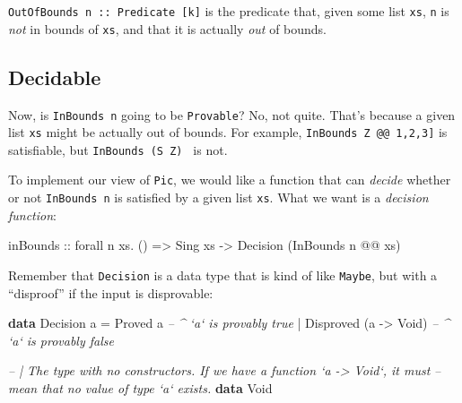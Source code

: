 \documentclass[]{article}
\newenvironment{Shaded}{}{}
\newcommand{\CommentTok}[1]{\textcolor[rgb]{0.38,0.63,0.69}{\textit{#1}}}
\newcommand{\DataTypeTok}[1]{\textcolor[rgb]{0.56,0.13,0.00}{#1}}
\newcommand{\FunctionTok}[1]{\textcolor[rgb]{0.02,0.16,0.49}{#1}}
\newcommand{\KeywordTok}[1]{\textcolor[rgb]{0.00,0.44,0.13}{\textbf{#1}}}
\newcommand{\NormalTok}[1]{#1}
\newcommand{\OtherTok}[1]{\textcolor[rgb]{0.00,0.44,0.13}{#1}}
\begin{document}
\texttt{OutOfBounds\ n\ ::\ Predicate\ {[}k{]}} is the predicate that, given
some list \texttt{xs}, \texttt{n} is \emph{not} in bounds of \texttt{xs}, and
that it is actually \emph{out} of bounds.

\hypertarget{decidable}{%
\subsection{Decidable}\label{decidable}}

Now, is \texttt{InBounds\ n} going to be \texttt{Provable}? No, not quite.
That's because a given list \texttt{xs} might be actually out of bounds. For
example,
\texttt{InBounds\ \textquotesingle{}Z\ @@\ \textquotesingle{}{[}1,2,3{]}} is
satisfiable, but
\texttt{InBounds\ (\textquotesingle{}S\ \textquotesingle{}Z)\ \textquotesingle{}{[}{]}}
is not.

To implement our view of \texttt{Pic}, we would like a function that can
\emph{decide} whether or not \texttt{InBounds\ n} is satisfied by a given list
\texttt{xs}. What we want is a \emph{decision function}:

\begin{Shaded}
\begin{Highlighting}[]
\OtherTok{inBounds ::}\NormalTok{ forall n xs}\FunctionTok{.}\NormalTok{ ()}
         \OtherTok{=>} \DataTypeTok{Sing}\NormalTok{ xs}
         \OtherTok{->} \DataTypeTok{Decision}\NormalTok{ (}\DataTypeTok{InBounds}\NormalTok{ n }\FunctionTok{@@}\NormalTok{ xs)}
\end{Highlighting}
\end{Shaded}

Remember that \texttt{Decision} is a data type that is kind of like
\texttt{Maybe}, but with a ``disproof'' if the input is disprovable:

\begin{Shaded}
\begin{Highlighting}[]
\KeywordTok{data} \DataTypeTok{Decision}\NormalTok{ a}
    \FunctionTok{=} \DataTypeTok{Proved}\NormalTok{     a                }\CommentTok{-- ^ `a` is provably true}
    \FunctionTok{|} \DataTypeTok{Disproved}\NormalTok{ (a }\OtherTok{->} \DataTypeTok{Void}\NormalTok{)       }\CommentTok{-- ^ `a` is provably false}

\CommentTok{-- | The type with no constructors.  If we have a function `a -> Void`, it must}
\CommentTok{-- mean that no value of type `a` exists.}
\KeywordTok{data} \DataTypeTok{Void}
\end{Highlighting}
\end{Shaded}
\end{document}
